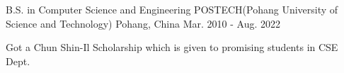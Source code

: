 

\begin{cventries}

  \cventry
    {B.S. in Computer Science and Engineering} %
    {POSTECH(Pohang University of Science and Technology)} %
    {Pohang, China} %
    {Mar. 2010 - Aug. 2022} %
    {
      \begin{cvitems} %
        \item {Got a Chun Shin-Il Scholarship which is given to promising students in CSE Dept.}
      \end{cvitems}
    }

\end{cventries}
